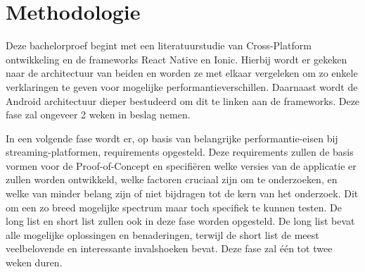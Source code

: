 




\section{Methodologie}%
\label{sec:methodologie}

Deze bachelorproef begint met een literatuurstudie van Cross-Platform ontwikkeling en de frameworks React Native en Ionic. Hierbij wordt er gekeken naar de architectuur van beiden en worden ze met elkaar vergeleken om zo enkele verklaringen te geven voor mogelijke performantieverschillen. Daarnaast wordt de Android architectuur dieper bestudeerd om dit te linken aan de frameworks. Deze fase zal ongeveer 2 weken in beslag nemen.

In een volgende fase wordt er, op basis van belangrijke performantie-eisen bij streaming-platformen, requirements opgesteld. Deze requirements zullen de basis vormen voor de Proof-of-Concept en specifiëren welke versies van de applicatie er zullen worden ontwikkeld, welke factoren cruciaal zijn om te onderzoeken, en welke van minder belang zijn of niet bijdragen tot de kern van het onderzoek. Dit om een zo breed mogelijke spectrum maar toch specifiek te kunnen testen. De long list en short list zullen ook in deze fase worden opgesteld. De long list bevat alle mogelijke oplossingen en benaderingen, terwijl de short list de meest veelbelovende en interessante invalshoeken bevat. Deze fase zal één tot twee weken duren.

